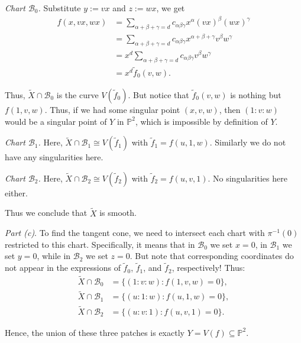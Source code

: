 \documentclass{template}
\begin{document}
\textit{Chart $\mathcal{B}_0$.} Substitute $y := vx$ and $z := wx$, we get
\begin{align*}
    f(x,vx,wx) &= \sum_{\alpha+\beta+\gamma=d}c_{\alpha\beta\gamma}x^{\alpha}(vx)^{\beta}(wx)^{\gamma} \\
    &= \sum_{\alpha+\beta+\gamma=d}c_{\alpha\beta\gamma}x^{\alpha+\beta+\gamma}v^{\beta}w^{\gamma} \\
    &= x^d\sum_{\alpha+\beta+\gamma=d}c_{\alpha\beta\gamma}v^{\beta}w^{\gamma} \\
    &= x^d \widetilde{f}_0(v,w).
\end{align*} 

Thus, $\widetilde{X} \cap \mathcal{B}_0$ is the curve $V(\widetilde{f}_0)$. But
notice that $\widetilde{f}_0(v,w)$ is nothing but $f(1,v,w)$. Thus, if we had
some singular point $(x,v,w)$, then $(1:v:w)$ would be a singular point of $Y$
in $\mathbb{P}^2$, which is impossible by definition of $Y$.

\textit{Chart $\mathcal{B}_1$.} Here, $\widetilde{X} \cap \mathcal{B}_1 \cong
V(\widetilde{f}_1)$ with $\widetilde{f}_1=f(u,1,w)$. Similarly we do not 
have any singularities here. 

\textit{Chart $\mathcal{B}_2$.} Here, $\widetilde{X} \cap \mathcal{B}_2 \cong
V(\widetilde{f}_2)$ with $\widetilde{f}_2=f(u,v,1)$. No singularities here
either.  

Thus we conclude that $\widetilde{X}$ is smooth.

\textcolor{blue!70!black}{\textit{Part (c)}}. To find the tangent cone, we need
to intersect each chart with $\pi^{-1}(0)$ restricted to this chart.
Specifically, it means that in $\mathcal{B}_0$ we set $x=0$, in $\mathcal{B}_1$
we set $y=0$, while in $\mathcal{B}_2$ we set $z=0$. But note that corresponding
coordinates do not appear in the expressions of $\widetilde{f}_0$,
$\widetilde{f}_1$, and $\widetilde{f}_2$, respectively! Thus:
\begin{align*}
    \widetilde{X} \cap \mathcal{B}_0 &= \{(1:v:w): f(1,v,w)=0\}, \\
    \widetilde{X} \cap \mathcal{B}_1 &= \{(u:1:w): f(u,1,w)=0\}, \\
    \widetilde{X} \cap \mathcal{B}_2 &= \{(u:v:1): f(u,v,1)=0\}.
\end{align*}

Hence, the union of these three patches is exactly $Y=V(f) \subseteq
\mathbb{P}^2$.
\end{document}
